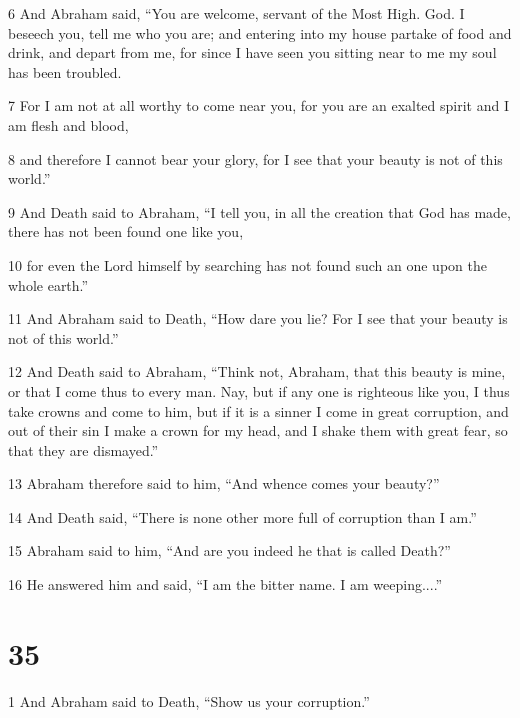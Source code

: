 \par 6 And Abraham said, “You are welcome, servant of the Most High. God. I beseech you, tell me who you are; and entering into my house partake of food and drink, and depart from me, for since I have seen you sitting near to me my soul has been troubled. 

\par 7 For I am not at all worthy to come near you, for you are an exalted spirit and I am flesh and blood, 

\par 8 and therefore I cannot bear your glory, for I see that your beauty is not of this world.” 

\par 9 And Death said to Abraham, “I tell you, in all the creation that God has made, there has not been found one like you, 

\par 10 for even the Lord himself by searching has not found such an one upon the whole earth.” 

\par 11 And Abraham said to Death, “How dare you lie? For I see that your beauty is not of this world.” 

\par 12 And Death said to Abraham, “Think not, Abraham, that this beauty is mine, or that I come thus to every man. Nay, but if any one is righteous like you, I thus take crowns and come to him, but if it is a sinner I come in great corruption, and out of their sin I make a crown for my head, and I shake them with great fear, so that they are dismayed.” 

\par 13 Abraham therefore said to him, “And whence comes your beauty?” 

\par 14 And Death said, “There is none other more full of corruption than I am.” 

\par 15 Abraham said to him, “And are you indeed he that is called Death?” 

\par 16 He answered him and said, “I am the bitter name. I am weeping....”

\chapter{35}

\par 1 And Abraham said to Death, “Show us your corruption.” 

